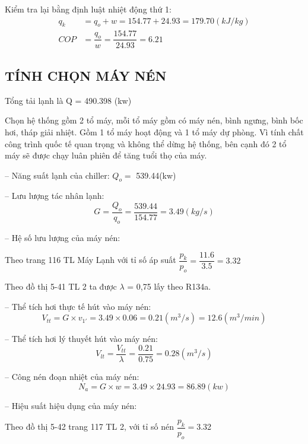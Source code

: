 Kiểm tra lại bằng định luật nhiệt động thứ 1:
\begin{equation*}
	\begin{split}
		q_{k} &= q_{o} + w = 154.77 + 24.93 = 179.70 (kJ/kg)\\	
		COP &= \dfrac{q_{o}}{w} = \dfrac{154.77}{24.93} = 6.21
	\end{split}
\end{equation*}

\subsection{TÍNH CHỌN MÁY NÉN}
Tổng tải lạnh là Q = 490.398 (kw)

Chọn hệ thống gồm 2 tổ máy, mỗi tổ máy gồm có máy nén, bình ngưng, bình bốc hơi, tháp giải nhiệt. Gồm 1 tổ máy hoạt động và 1 tổ máy dự phòng. Vì tính chất công trình quốc tế quan trọng và không thể dừng hệ thống, bên cạnh đó 2 tổ máy sẽ được chạy luân phiên để tăng tuổi thọ của máy.

-- Năng suất lạnh của chiller: $Q_{o} = $ 539.44(kw)

-- Lưu lượng tác nhân lạnh: 
\begin{equation*}
	G = \dfrac{Q_{o}}{q_{o}} = \dfrac{539.44}{154.77} = 3.49 (kg/s)
\end{equation*}

-- Hệ số lưu lượng của máy nén: 

Theo trang 116 TL Máy Lạnh với tỉ số áp suất $\dfrac{p_{k}}{p_{o}} = \dfrac{11.6}{3.5} = 3.32$
	
Theo đồ thị 5-41 TL 2 ta được $\lambda$ = 0,75 lấy theo R134a.


-- Thể tích hơi thực tế hút vào máy nén: 
\begin{equation*}
	V_{tt} = G \times v_{1'} = 3.49 \times 0.06 = 0.21(m^3/s) = 12.6(m^3/min)
\end{equation*}

-- Thể tích hơi lý thuyết hút vào máy nén:
\begin{equation*}
	V_{lt} = \dfrac{V_{tt}}{\lambda} = \dfrac{0.21}{0.75} = 0.28 (m^3/s)
\end{equation*}

-- Công nén đoạn nhiệt của máy nén:
\begin{equation*}
	N_{a} = G\times w = 3.49 \times 24.93 = 86.89 (kw)
\end{equation*}

-- Hiệu suất hiệu dụng của máy nén:

Theo đồ thị 5-42 trang 117 TL 2, với tỉ số nén $ \dfrac{p_{k}}{p_{o}} =  $3.32

